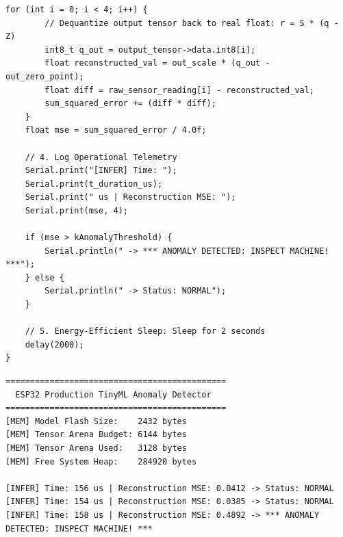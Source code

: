 \begin{lstlisting}[style=pythonstyle, caption={Complete production-grade ESP32 TinyML anomaly detector with profiling.}, label={lst:complete_esp32_sketch}]
    for (int i = 0; i < 4; i++) {
        // Dequantize output tensor back to real float: r = S * (q - Z)
        int8_t q_out = output_tensor->data.int8[i];
        float reconstructed_val = out_scale * (q_out - out_zero_point);
        float diff = raw_sensor_reading[i] - reconstructed_val;
        sum_squared_error += (diff * diff);
    }
    float mse = sum_squared_error / 4.0f;

    // 4. Log Operational Telemetry
    Serial.print("[INFER] Time: ");
    Serial.print(t_duration_us);
    Serial.print(" us | Reconstruction MSE: ");
    Serial.print(mse, 4);

    if (mse > kAnomalyThreshold) {
        Serial.println(" -> *** ANOMALY DETECTED: INSPECT MACHINE! ***");
    } else {
        Serial.println(" -> Status: NORMAL");
    }

    // 5. Energy-Efficient Sleep: Sleep for 2 seconds
    delay(2000);
}
\end{lstlisting}

\begin{lstlisting}[style=outputstyle, caption={Serial Monitor output from the ESP32 anomaly detection deployment.}]
=============================================
  ESP32 Production TinyML Anomaly Detector   
=============================================
[MEM] Model Flash Size:    2432 bytes
[MEM] Tensor Arena Budget: 6144 bytes
[MEM] Tensor Arena Used:   3128 bytes
[MEM] Free System Heap:    284920 bytes

[INFER] Time: 156 us | Reconstruction MSE: 0.0412 -> Status: NORMAL
[INFER] Time: 154 us | Reconstruction MSE: 0.0385 -> Status: NORMAL
[INFER] Time: 158 us | Reconstruction MSE: 0.4892 -> *** ANOMALY DETECTED: INSPECT MACHINE! ***
\end{lstlisting}

